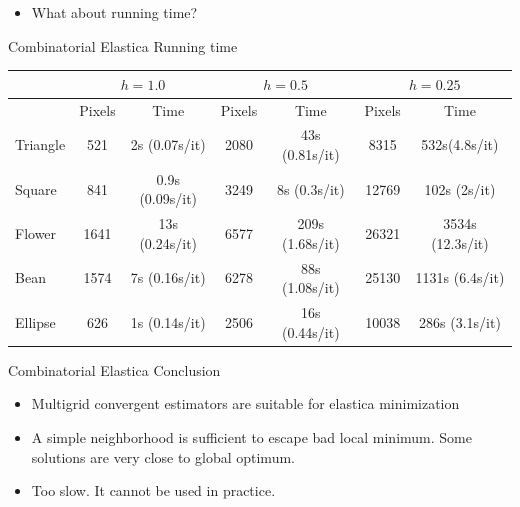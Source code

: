 \begin{frame}
\vspace{1em}
\pause

\begin{itemize}
\item{What about running time?}
\end{itemize}

\end{frame}

\begin{frame}
{Combinatorial Elastica}
{Running time}
\begin{center}
\captionsetup{type=table}
\scriptsize
\begin{tabular}{|l|c|c|c|c|c|c|}
\hline
& \multicolumn{2}{c|}{$h=1.0$} & \multicolumn{2}{c|}{$h=0.5$} & \multicolumn{2}{c|}{$h=0.25$}\\
\hline
& Pixels & Time & Pixels & Time & Pixels & Time\\
\hline
Triangle & 521 & 2s (0.07s/it)  & 2080 & 43s (0.81s/it) & 8315 & 532s(4.8s/it)\\
{\color{highlightcolor}Square} & 841 & 0.9s (0.09s/it) & 3249 & 8s (0.3s/it) & {\color{highlightcolor}12769} & {\color{highlightcolor}102s (2s/it)}\\
{\color{highlightcolor}Flower} & 1641 & 13s (0.24s/it) & 6577 & 209s (1.68s/it) & {\color{highlightcolor}26321} & {\color{highlightcolor}3534s (12.3s/it)}\\
Bean  & 1574 & 7s (0.16s/it) & 6278 & 88s (1.08s/it) & 25130 & 1131s (6.4s/it)\\
Ellipse  & 626 & 1s (0.14s/it) & 2506 & 16s (0.44s/it) & 10038 & 286s (3.1s/it)\\
\hline
\end{tabular}
\caption{\textbf{Running time for the free elastica problem.} Quite high running times. The geometry of the shape influences in the total running time.}
\end{center}
\end{frame}

\begin{frame}
{Combinatorial Elastica}
{Conclusion}

\begin{itemize}
\item{Multigrid convergent estimators are suitable for elastica minimization}\\[1em]
\item{A simple neighborhood is sufficient to escape bad local minimum. Some solutions are very close to global optimum.}\\[1em]
\item{Too slow. It cannot be used in practice.}
\end{itemize}
\end{frame}